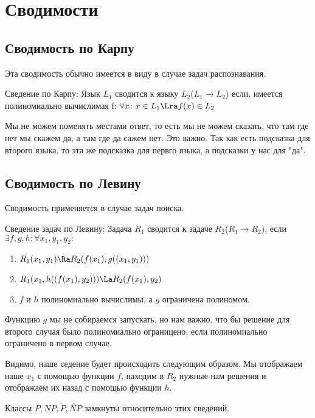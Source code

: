 ﻿\section{Сводимости}
\subsection{Сводимость по Карпу}
Эта сводимость обычно имеется в виду в случае задач распознавания.
\begin{Def}
	Сведение по Карпу: 
	Язык $L_1$ сводится к языку $L_2$($L_1 \to L_2$) если, имеется полиномиально вычислимая f:
	$\forall x \colon x \in L_1 \Lra f(x) \in L_2$
\end{Def}

\begin{Rem}
	Мы не можем поменять местами ответ, то есть мы не можем сказать, что там где нет мы скажем да, а там где да сажем нет. 
	Это важно. Так как есть подсказка для второго языка, то эта же подсказка для первго языка, а подсказки у нас для "да".
\end{Rem}

\subsection{Сводимость по Левину}
Сводимость применяется в случае задач поиска. 
\begin{Def}
	Сведение задач по Левину:
	Задача $R_1$ сводится к задаче $R_2$($R_1 \to R_2$), если $\exists f, g, h \colon \forall x_1, y_1, y_2:$
	\begin{enumerate}
	\item $R_1(x_1, y_1) \Ra R_2(f(x_1), g((x_1, y_1)))$
   	\item $R_1(x_1, h((f(x_1), y_2))) \La R_2(f(x_1), y_2)$
    	\item $f$ и $h$ полиномиально вычислимы, а $g$ ограничена полиномом. 
	\end{enumerate}
\end{Def}
\begin{Rem}
	Функцию $g$ мы не собираемся запускать, но нам важно, что бы решение для второго случая 
	было полиномиально ограницено, если полиномиально ограничено в первом случае.  
\end{Rem}

Видимо, наше седение будет происходить следующим образом. Мы отображаем наше $x_1$ с помощью функции $f$, 
находим в $R_2$ нужные нам решения и отображаем их назад с помощью функции $h$.

\begin{Rem}
	Классы $P, NP, \tilde{P}, \tilde{NP}$ замкнуты относительно 
	этих сведений. 
\end{Rem}

